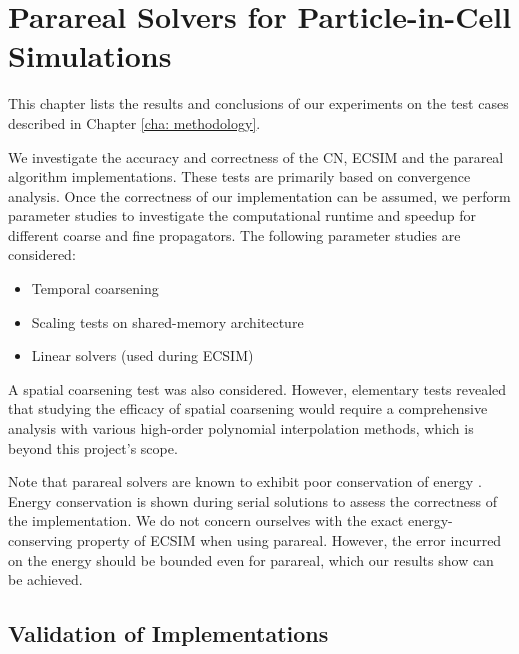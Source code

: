 \chapter{Parareal Solvers for Particle-in-Cell Simulations}
\label{cha: results}


This chapter lists the results and conclusions of our experiments on the test cases described in Chapter \ref{cha: methodology}. 

We investigate the accuracy and correctness of the CN, ECSIM and the parareal algorithm implementations. These tests are primarily based on convergence analysis. 
Once the correctness of our implementation can be assumed, we perform parameter studies to investigate the computational runtime and speedup for different coarse and fine propagators. 
 The following parameter studies are considered: 
 \begin{itemize}
 
    \item Temporal coarsening
    
    \item Scaling tests on shared-memory architecture
    
    \item Linear solvers (used during ECSIM)
 
 \end{itemize}
A spatial coarsening test was also considered. However, elementary tests revealed that studying the efficacy of spatial coarsening would require a comprehensive analysis with various high-order polynomial interpolation methods, which is beyond this project's scope. 

Note that parareal solvers are known to exhibit poor conservation of energy \cite{gander_analysis_2014}. Energy conservation is shown during serial solutions to assess the correctness of the implementation. We do not concern ourselves with the exact energy-conserving property of ECSIM when using parareal. However, the error incurred on the energy should be bounded even for parareal, which our results show can be achieved.

\section{Validation of Implementations}

